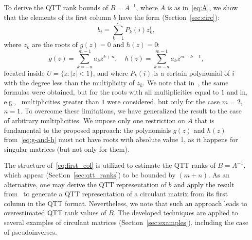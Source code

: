 \documentclass[a4paper]{article}
\newcommand{\LL}{L}
\begin{document}

To derive the QTT rank bounds of $B=A^{-1}$, where $A$ is as in~\eqref{eq:A}, we show that the elements of its first column $b$ have the form (Section~\ref{sec:circ}):
\begin{equation}\label{eq:first_col}
     b_{i} = \sum_{k=1}^s P_{k} (i) z_k^i,
\end{equation}
where $z_k$ are the roots of $g(z)=0$ and $h(z)=0$:
\begin{equation}\label{eq:g-and-h}
    g(z) = \sum_{k=-n}^{m-1}a_{k}z^{k+n}, \quad h(z) = \sum_{k=-n}^{m-1}a_{k}z^{m-k-1},
\end{equation}
%    
located inside $U=\{z:|z|<1\}$, and where $P_k(i)$ is a certain polynomial of $i$ with the degree less than the multiplicity of $z_k$. 
We note that in~\cite{fuyong2011inverse}, the same formulas were obtained, but for the roots with all multiplicities equal to $1$ and in, e.g.,~\cite{searle1979inverting} multiplicities greater than $1$ were considered, but only for the case $m=2$, $n=1$. 
To overcome these limitations, we have generalized the result to the case of arbitrary multiplicities.
We impose only one restriction on $A$ that is fundamental to the proposed approach: the polynomials $g(z)$ and $h(z)$ from~\eqref{eq:g-and-h} must not have roots with absolute value 1, as it happens for singular matrices (but not only for them).

The structure of~\eqref{eq:first_col} is utilized to estimate the QTT ranks of $B = A^{-1}$, which appear (Section~\ref{sec:qtt_ranks}) to be bounded by $(m+n)$.
As an alternative, one may derive the QTT representation of $b$ and apply the result from~\cite{khkaz-conv-2013} to generate a QTT representation of a circulant matrix from its first column in the QTT format.
Nevertheless, we note that such an approach leads to overestimated QTT rank values of $B$.
The developed techniques are  applied to several examples of circulant matrices (Section~\ref{sec:examples}), including the case of pseudoinverses.
\end{document}
